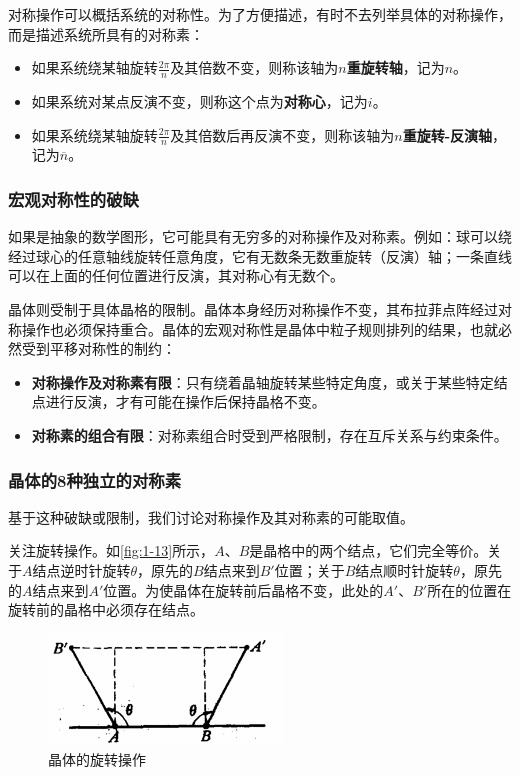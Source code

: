     对称操作可以概括系统的对称性。为了方便描述，有时不去列举具体的对称操作，而是描述系统所具有的对称素：
    \begin{itemize}[itemsep=0pt,parsep=0pt]
        \item 如果系统绕某轴旋转$\frac{2\pi}{n}$及其倍数不变，则称该轴为\textbf{$n$重旋转轴}，记为$n$。
        \item 如果系统对某点反演不变，则称这个点为\textbf{对称心}，记为$i$。
        \item 如果系统绕某轴旋转$\frac{2\pi}{n}$及其倍数后再反演不变，则称该轴为\textbf{$n$重旋转-反演轴}，记为$\overline{n}$。
    \end{itemize}

\subsubsection{宏观对称性的破缺}
    如果是抽象的数学图形，它可能具有无穷多的对称操作及对称素。例如：球可以绕经过球心的任意轴线旋转任意角度，它有无数条无数重旋转（反演）轴；一条直线可以在上面的任何位置进行反演，其对称心有无数个。

    晶体则受制于具体晶格的限制。晶体本身经历对称操作不变，其布拉菲点阵经过对称操作也必须保持重合。晶体的宏观对称性是晶体中粒子规则排列的结果，也就必然受到平移对称性的制约：
    \begin{itemize}[itemsep=0pt,parsep=0pt]
        \item \textbf{对称操作及对称素有限}：只有绕着晶轴旋转某些特定角度，或关于某些特定结点进行反演，才有可能在操作后保持晶格不变。
        \item \textbf{对称素的组合有限}：对称素组合时受到严格限制，存在互斥关系与约束条件。
    \end{itemize}

\subsubsection{晶体的8种独立的对称素}
    基于这种破缺或限制，我们讨论对称操作及其对称素的可能取值。

    关注旋转操作。如\autoref{fig:1-13}所示，$A$、$B$是晶格中的两个结点，它们完全等价。关于$A$结点逆时针旋转$\theta$，原先的$B$结点来到$B'$位置；关于$B$结点顺时针旋转$\theta$，原先的$A$结点来到$A'$位置。为使晶体在旋转前后晶格不变，此处的$A'$、$B'$所在的位置在旋转前的晶格中必须存在结点。

    \begin{figure}[!htbp]
        \centering    
        \includegraphics[height=8em, keepaspectratio=true]{pic/1-43}
        \caption{晶体的旋转操作}
        \label{fig:1-13}
    \end{figure}
    
